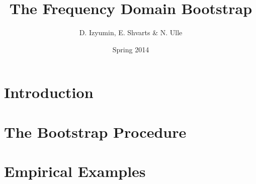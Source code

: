 \documentclass{article}
\title{The Frequency Domain Bootstrap}
\author{D. Izyumin, E. Shvarts \& N. Ulle}
\date{Spring 2014}
\newcommand{\1}{ \vec{1} }
\begin{document}
\maketitle

\section*{Introduction}


\section*{The Bootstrap Procedure}


\section*{Empirical Examples}


\FloatBarrier

\end{document}
